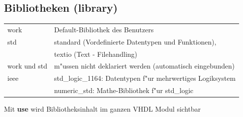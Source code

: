 \begin{minipage}[t]{0.59\textwidth}
	\subsection{Bibliotheken (library)}
	\begin{tabular}{ll}
		work & Default-Bibliothek des Benutzers \\
		std & standard (Vordefinierte Datentypen und Funktionen),\\
		& textio (Text -  Filehandling)\\
		work und std &m"ussen nicht deklariert werden (automatisch eingebunden)\\
		ieee & std\_logic\_1164: Datentypen f"ur mehrwertiges Logiksystem\\
		& numeric\_std: Mathe-Bibliothek f"ur std\_logic
	\end{tabular}
\end{minipage}
\hfill
\begin{minipage}[t]{0.3\textwidth}
	
	Mit \textbf{use} wird Bibliotheksinhalt im ganzen VHDL Modul sichtbar
\end{minipage}

